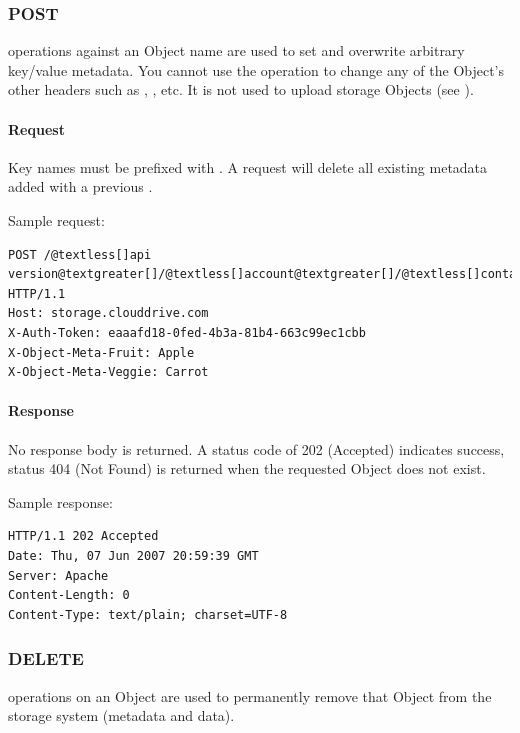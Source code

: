 \documentclass[letterpaper,10pt,english]{manual}
\begin{document}
\subsubsection{POST}

 operations against an Object name are used to set and overwrite
arbitrary key/value metadata.  You cannot use the  operation to
change any of the Object's other headers such as ,
, etc.  It is not used to upload storage Objects (see ).


\paragraph{Request}

Key names must be prefixed with .  A  request
will delete all existing metadata added with a previous .

Sample request:

\begin{Verbatim}[commandchars=@\[\]]
POST /@textless[]api version@textgreater[]/@textless[]account@textgreater[]/@textless[]container@textgreater[]/@textless[]object@textgreater[] HTTP/1.1
Host: storage.clouddrive.com
X-Auth-Token: eaaafd18-0fed-4b3a-81b4-663c99ec1cbb
X-Object-Meta-Fruit: Apple
X-Object-Meta-Veggie: Carrot
\end{Verbatim}


\paragraph{Response}

No response body is returned. A status code of 202 (Accepted) indicates
success, status 404 (Not Found) is returned when the requested Object
does not exist.

Sample response:

\begin{Verbatim}[commandchars=@\[\]]
HTTP/1.1 202 Accepted
Date: Thu, 07 Jun 2007 20:59:39 GMT
Server: Apache
Content-Length: 0
Content-Type: text/plain; charset=UTF-8
\end{Verbatim}


\subsubsection{DELETE}

 operations on an Object are used to permanently remove that
Object from the storage system (metadata and data).
\end{document}
